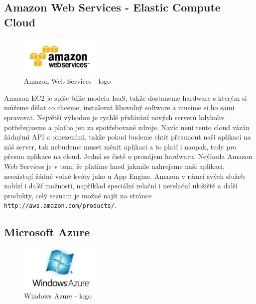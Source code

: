 \subsection{Amazon Web Services - Elastic Compute Cloud}

\begin{figure}[h]
\begin{center}
\includegraphics[width=1.5in]{figures/aws-logo.png}
\caption{Amazon Web Services - logo}
\label{fig:aws-logo}
\end{center}
\end{figure}

Amazon EC2 je spíše blíže modelu IaaS, takže dostaneme hardware s kterým si můžeme dělat co chceme, instalovat libovolný software a musíme si ho sami spravovat. Největší výhodou je rychlé přidávání nových serverů kdykoliv potřebujueme a platba jen za spotřebované zdroje. Navíc není tento cloud vázán žádnými API a omezeními, takže pokud budeme chtít přesunout naši aplikaci na náš server, tak nebudeme muset měnit aplikaci a to platí i naopak, tedy pro přesun aplikace na cloud. Jedná se čistě o pronájem hardwaru. Neýhoda Amazon Web Services je v tom, že platíme hned jakmile nahrejeme naši aplikaci, neexistují žádné volné kvóty jako u App Engine. Amazon v rámci svých služeb nabízí i další možnosti, například speciální relační i nerelační uložiště a další produkty, celý seznam je možné najít na stránce \verb|http://aws.amazon.com/products/|. 

\subsection{Microsoft Azure}

\begin{figure}[h]
\begin{center}
\includegraphics[width=1.5in]{figures/azure-logo.jpg}
\caption{Windows Azure - logo}
\label{fig:azure-logo}
\end{center}
\end{figure}

